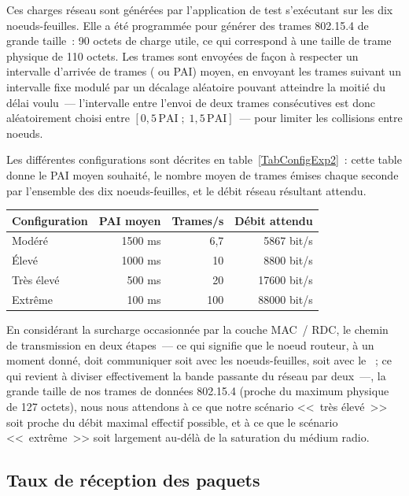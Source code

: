 Ces charges réseau sont générées par l'application de test s'exécutant
sur les dix noeuds-feuilles. Elle a été programmée pour générer des
trames 802.15.4 de grande taille~: 90 octets de charge utile, ce qui
correspond à une taille de trame physique de 110 octets. Les trames
sont envoyées de façon à respecter un intervalle d'arrivée de trames
( ou PAI) moyen, en envoyant les
trames suivant un intervalle fixe modulé par un décalage aléatoire
pouvant atteindre la moitié du délai voulu~--- l'intervalle entre l'envoi
de deux trames consécutives est donc aléatoirement choisi entre
$[0,5\,\mathrm{PAI}\;;\;1,5\,\mathrm{PAI}]$~--- pour limiter les collisions
entre noeuds.

Les différentes configurations sont décrites en
table~\vref{TabConfigExp2}~: cette table donne le PAI moyen souhaité,
le nombre moyen de trames émises chaque seconde par l'ensemble des dix
noeuds-feuilles, et le débit réseau résultant attendu.


\begin{table}[htb]
\centering
\begin{tabular}{|l|r|r|r|}
\hline
Configuration & PAI moyen & Trames/s & Débit attendu \\
\hline
Modéré        &  1500 ms  &     6,7   &   5867 bit/s \\ 
\'Elevé       &  1000 ms  &    10     &   8800 bit/s \\
Très élevé    &   500 ms  &    20     &  17600 bit/s \\
Extrême       &   100 ms  &   100     &  88000 bit/s \\
\hline
\end{tabular}
\label{TabConfigExp2}
\end{table}


En considérant la surcharge occasionnée par la couche MAC~/ RDC, le chemin
de transmission en deux étapes~--- ce qui signifie que le noeud routeur,
à un moment donné, doit communiquer soit avec les noeuds-feuilles, soit
avec le ~; ce qui revient à diviser effectivement la bande
passante du réseau par deux~---, la grande taille de nos trames de données
802.15.4 (proche du maximum physique de 127 octets), nous nous attendons
à ce que notre scénario <<~très élevé~>> soit proche du débit maximal
effectif possible, et à ce que le scénario <<~extrême~>> soit largement
au-délà de la saturation du médium radio.


\subsection{Taux de réception des paquets}
\label{SubsecTRP}

